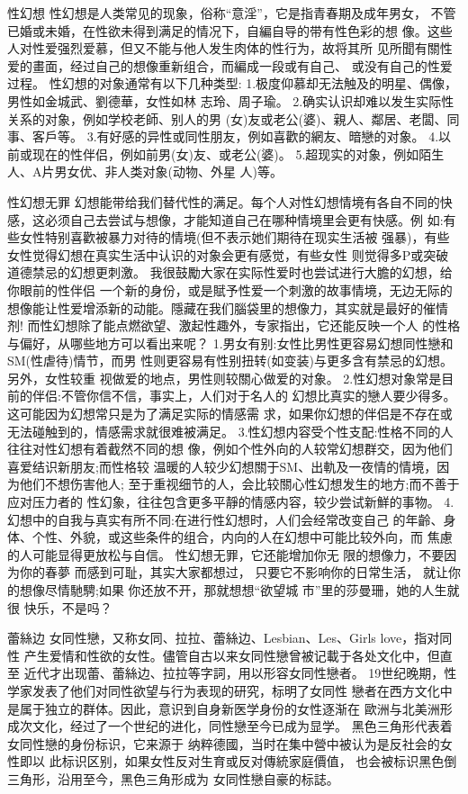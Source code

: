 \documentclass[12pt,UTF8]{ctexbook}
\begin{document}
性幻想
性幻想是人类常见的现象，俗称“意淫”，它是指青春期及成年男女，
不管已婚或未婚，在性欲未得到满足的情况下，自編自导的带有性色彩的想
像。这些人对性爱强烈爱慕，但又不能与他人发生肉体的性行为，故将其所
见所聞有關性爱的畫面，经过自己的想像重新组合，而編成一段或有自己、
或没有自己的性爱过程。
性幻想的对象通常有以下几种类型:
1.极度仰慕却无法触及的明星、偶像，男性如金城武、劉德華，女性如林
志玲、周子瑜。
2.确实认识却难以发生实际性关系的对象，例如学校老師、别人的男
(女)友或老公(婆)、親人、鄰居、老闆、同事、客戶等。
3.有好感的异性或同性朋友，例如喜歡的網友、暗戀的对象。
4.以前或现在的性伴侣，例如前男(女)友、或老公(婆)。
5.超现实的对象，例如陌生人、A片男女优、非人类对象(动物、外星
人)等。

性幻想无罪
幻想能带给我们替代性的满足。每个人对性幻想情境有各自不同的快
感，这必须自己去尝试与想像，才能知道自己在哪种情境里会更有快感。例
如:有些女性特别喜歡被暴力对待的情境(但不表示她们期待在现实生活被
强暴)，有些女性觉得幻想在真实生活中认识的对象会更有感觉，有些女性
则觉得多P或突破道德禁忌的幻想更刺激。
我很鼓勵大家在实际性爱时也尝试进行大膽的幻想，给你眼前的性伴侣
一个新的身份，或是賦予性爱一个刺激的故事情境，无边无际的想像能让性爱增添新的动能。隱藏在我们腦袋里的想像力，其实就是最好的催情剂!
而性幻想除了能点燃欲望、激起性趣外，专家指出，它还能反映一个人
的性格与偏好，从哪些地方可以看出来呢？
1.男女有别:女性比男性更容易幻想同性戀和SM(性虐待)情节，而男
性则更容易有性别扭转(如变装)与更多含有禁忌的幻想。另外，女性较重
视做爱的地点，男性则较關心做爱的对象。
2.性幻想对象常是目前的伴侣:不管你信不信，事实上，人们对于名人的
幻想比真实的戀人要少得多。这可能因为幻想常只是为了满足实际的情感需
求，如果你幻想的伴侣是不存在或无法碰触到的，情感需求就很难被满足。
3.性幻想内容受个性支配:性格不同的人往往对性幻想有着截然不同的想
像，例如个性外向的人较常幻想群交，因为他们喜爱结识新朋友;而性格较
温暖的人较少幻想關于SM、出軌及一夜情的情境，因为他们不想伤害他人;
至于重视细节的人，会比较關心性幻想发生的地方;而不善于应对压力者的
性幻象，往往包含更多平靜的情感内容，较少尝试新鮮的事物。
4.幻想中的自我与真实有所不同:在进行性幻想时，人们会经常改变自己
的年齡、身体、个性、外貌，或这些条件的组合，内向的人在幻想中可能比较外向，而
焦慮的人可能显得更放松与自信。
性幻想无罪，它还能增加你无
限的想像力，不要因为你的春夢
而感到可耻，其实大家都想过，
只要它不影响你的日常生活，
就让你的想像尽情馳騁;如果
你还放不开，那就想想“欲望城
市”里的莎曼珊，她的人生就很
快乐，不是吗？

蕾絲边
女同性戀，又称女同、拉拉、蕾絲边、Lesbian、Les、Girls love，指对同性
产生爱情和性欲的女性。儘管自古以来女同性戀曾被记載于各处文化中，但直至
近代才出现蕾、蕾絲边、拉拉等字詞，用以形容女同性戀者。
19世纪晚期，性学家发表了他们对同性欲望与行为表现的研究，标明了女同性
戀者在西方文化中是属于独立的群体。因此，意识到自身新医学身份的女性逐渐在
歐洲与北美洲形成次文化，经过了一个世纪的进化，同性戀至今已成为显学。
黑色三角形代表着女同性戀的身份标识，它来源于
纳粹德國，当时在集中營中被认为是反社会的女性即以
此标识区别，如果女性反对生育或反对傳統家庭價值，
也会被标识黑色倒三角形，沿用至今，黑色三角形成为
女同性戀自豪的标誌。
\end{document}
